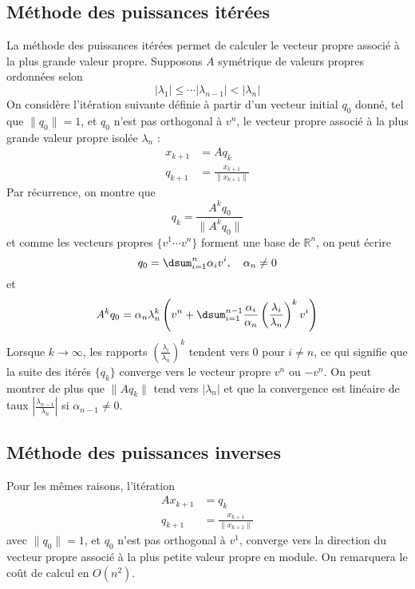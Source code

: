 \subsection{Méthode des puissances itérées}  %

La méthode des puissances itérées permet de calculer le vecteur propre associé à la plus grande valeur propre.
Supposons $A$ symétrique de valeurs propres ordonnées selon $$|\lambda_1|\leq\cdots|\lambda_{n-1}|<|\lambda_n|$$
On considère l'itération suivante définie à partir d'un vecteur initial $q_0$ donné, tel que $\|q_0\|=1$, et $q_0$ n'est pas orthogonal à $v^n$, le vecteur propre associé à la plus grande valeur propre isolée $\lambda_n$ :
\begin{align*}
x_{k+1}&=Aq_k\\
q_{k+1}&=\frac{x_{k+1}}{\|x_{k+1}\|}
\end{align*}
Par récurrence, on montre que 
$$q_k=\frac{A^kq_0}{\|A^kq_0\|}$$
 et comme les vecteurs propres $\{v^1\cdots v^n\}$ forment une base de $\mathbb{R}^n$, on peut écrire 
 $$q_0=\dsum_{i=1}^n\alpha_iv^i,\quad\alpha_n\neq 0$$
 et 
 $$A^kq_0=\alpha_n\lambda_n^k\left (v^n+\dsum_{i=1}^{n-1}\frac{\alpha_i}{\alpha_n}\left (\frac{\lambda_i}{\lambda_n}\right )^kv^i\right )$$
 Lorsque $k\rightarrow\infty$, les rapports $\left (\frac{\lambda_i}{\lambda_n}\right )^k$ tendent vers 0 pour $i\neq n$, 
 ce qui signifie que la suite des itérés $\{q_k\}$ converge vers le vecteur propre $v^n$ ou $-v^n$. 
 On peut montrer de plus que $\|Aq_k\|$ tend vers $|\lambda_n|$ et que la convergence est linéaire de taux $\left |\frac{\lambda_{n-1}}{\lambda_n}\right |$ si $\alpha_{n-1}\neq 0$.

\subsection{Méthode des puissances inverses}  %
Pour les mêmes raisons, l'itération 
\begin{align*}
Ax_{k+1}&=q_k\\
q_{k+1}&=\frac{x_{k+1}}{\|x_{k+1}\|}
\end{align*}
avec $\|q_0\|=1$, et $q_0$ n'est pas orthogonal à $v^1$, converge vers la direction du vecteur propre associé à la plus 
petite valeur propre en module. On remarquera le coût de calcul en $O(n^2)$.

